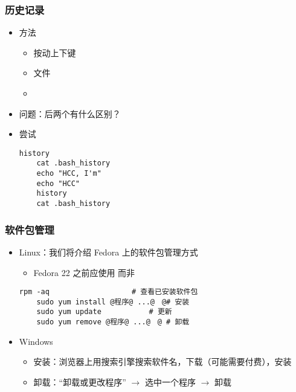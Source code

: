 \begin{CJK}{UTF8}{gbsn}
\begin{frame} [fragile]
	\frametitle{历史记录}
	\linespread{1.25}
	\begin{itemize}
	\item 方法
		\begin{itemize}
		\item 按动上下键
		\item 文件 
		\item {}
		\end{itemize}
	\item 问题：后两个有什么区别？
	\item 尝试
	\begin{lstlisting}[style=bashstyle, gobble=4, texcl]
	history
	cat .bash_history
	echo "HCC, I'm"
	echo "HCC"
	history
	cat .bash_history
	\end{lstlisting}
	\end{itemize}
\end{frame}

\begin{frame} [fragile]
	\frametitle{软件包管理}
	\linespread{1.25}
	\begin{itemize}
	\item Linux：我们将介绍 Fedora 上的软件包管理方式
		\begin{itemize}
		\item Fedora 22 之前应使用  而非 
		\end{itemize}
	\begin{lstlisting}[style=bashstyle, gobble=4, texcl, escapechar=@]
	rpm -aq					  # 查看已安装软件包
	sudo yum install @程序@ ...@　@# 安装
	sudo yum update			  # 更新
	sudo yum remove @程序@ ...@　@ # 卸载
	\end{lstlisting}
	\item Windows
		\begin{itemize}
		\item 安装：浏览器上用搜索引擎搜索软件名，下载（可能需要付费），安装
		\item 卸载：``卸载或更改程序'' $\to$ 选中一个程序 $\to$ 卸载
		\end{itemize}
	\end{itemize}
\end{frame}


\end{CJK}
